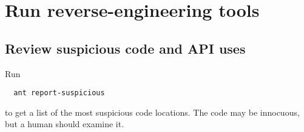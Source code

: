 \section{Run reverse-engineering tools\label{sec:reverse-engineering}}



\subsection{Review suspicious code and API uses}
\label{sec:appanalysis/suspicious}

Run

\begin{Verbatim}
  ant report-suspicious
\end{Verbatim}

\noindent
to get a list of the most suspicious code
locations. 
The code may be innocuous, but a human should examine it.

